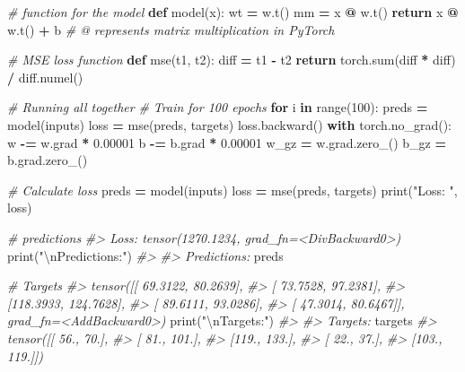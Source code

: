 \documentclass[]{book}
\newenvironment{Shaded}{\begin{snugshade}}{\end{snugshade}}
\newcommand{\BuiltInTok}[1]{#1}
\newcommand{\CharTok}[1]{\textcolor[rgb]{0.31,0.60,0.02}{#1}}
\newcommand{\CommentTok}[1]{\textcolor[rgb]{0.56,0.35,0.01}{\textit{#1}}}
\newcommand{\ControlFlowTok}[1]{\textcolor[rgb]{0.13,0.29,0.53}{\textbf{#1}}}
\newcommand{\DecValTok}[1]{\textcolor[rgb]{0.00,0.00,0.81}{#1}}
\newcommand{\FloatTok}[1]{\textcolor[rgb]{0.00,0.00,0.81}{#1}}
\newcommand{\KeywordTok}[1]{\textcolor[rgb]{0.13,0.29,0.53}{\textbf{#1}}}
\newcommand{\NormalTok}[1]{#1}
\newcommand{\OperatorTok}[1]{\textcolor[rgb]{0.81,0.36,0.00}{\textbf{#1}}}
\newcommand{\StringTok}[1]{\textcolor[rgb]{0.31,0.60,0.02}{#1}}
\begin{document}
\begin{Shaded}
\begin{Highlighting}[]
\CommentTok{# function for the model}
\KeywordTok{def}\NormalTok{ model(x):}
\NormalTok{  wt }\OperatorTok{=}\NormalTok{ w.t()}
\NormalTok{  mm }\OperatorTok{=}\NormalTok{ x }\OperatorTok{@}\NormalTok{ w.t()}
  \ControlFlowTok{return}\NormalTok{ x }\OperatorTok{@}\NormalTok{ w.t() }\OperatorTok{+}\NormalTok{ b       }\CommentTok{# @ represents matrix multiplication in PyTorch}

\CommentTok{# MSE loss function}
\KeywordTok{def}\NormalTok{ mse(t1, t2):}
\NormalTok{  diff }\OperatorTok{=}\NormalTok{ t1 }\OperatorTok{-}\NormalTok{ t2}
  \ControlFlowTok{return}\NormalTok{ torch.}\BuiltInTok{sum}\NormalTok{(diff }\OperatorTok{*}\NormalTok{ diff) }\OperatorTok{/}\NormalTok{ diff.numel()}

\CommentTok{# Running all together}
\CommentTok{# Train for 100 epochs}
\ControlFlowTok{for}\NormalTok{ i }\KeywordTok{in} \BuiltInTok{range}\NormalTok{(}\DecValTok{100}\NormalTok{):}
\NormalTok{  preds }\OperatorTok{=}\NormalTok{ model(inputs)}
\NormalTok{  loss }\OperatorTok{=}\NormalTok{ mse(preds, targets)}
\NormalTok{  loss.backward()}
  \ControlFlowTok{with}\NormalTok{ torch.no_grad():}
\NormalTok{    w }\OperatorTok{-=}\NormalTok{ w.grad }\OperatorTok{*} \FloatTok{0.00001}
\NormalTok{    b }\OperatorTok{-=}\NormalTok{ b.grad }\OperatorTok{*} \FloatTok{0.00001}
\NormalTok{    w_gz }\OperatorTok{=}\NormalTok{ w.grad.zero_()}
\NormalTok{    b_gz }\OperatorTok{=}\NormalTok{ b.grad.zero_()}
    
\CommentTok{# Calculate loss}
\NormalTok{preds }\OperatorTok{=}\NormalTok{ model(inputs)}
\NormalTok{loss }\OperatorTok{=}\NormalTok{ mse(preds, targets)}
\BuiltInTok{print}\NormalTok{(}\StringTok{"Loss: "}\NormalTok{, loss)    }

\CommentTok{# predictions}
\CommentTok{#> Loss:  tensor(1270.1234, grad_fn=<DivBackward0>)}
\BuiltInTok{print}\NormalTok{(}\StringTok{"}\CharTok{\textbackslash{}n}\StringTok{Predictions:"}\NormalTok{)}
\CommentTok{#> }
\CommentTok{#> Predictions:}
\NormalTok{preds}

\CommentTok{# Targets}
\CommentTok{#> tensor([[ 69.3122,  80.2639],}
\CommentTok{#>         [ 73.7528,  97.2381],}
\CommentTok{#>         [118.3933, 124.7628],}
\CommentTok{#>         [ 89.6111,  93.0286],}
\CommentTok{#>         [ 47.3014,  80.6467]], grad_fn=<AddBackward0>)}
\BuiltInTok{print}\NormalTok{(}\StringTok{"}\CharTok{\textbackslash{}n}\StringTok{Targets:"}\NormalTok{)}
\CommentTok{#> }
\CommentTok{#> Targets:}
\NormalTok{targets}
\CommentTok{#> tensor([[ 56.,  70.],}
\CommentTok{#>         [ 81., 101.],}
\CommentTok{#>         [119., 133.],}
\CommentTok{#>         [ 22.,  37.],}
\CommentTok{#>         [103., 119.]])}
\end{Highlighting}
\end{Shaded}
\end{document}
